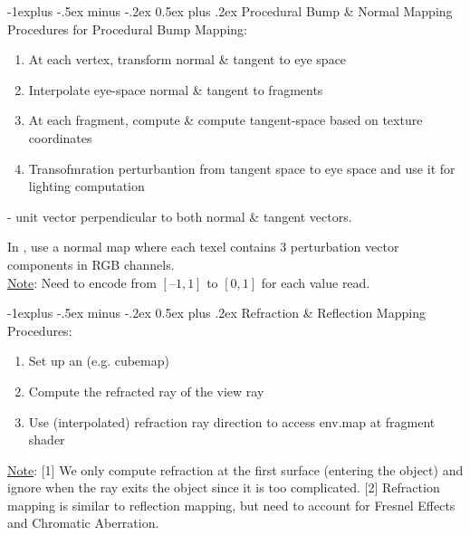 \documentclass[10pt,landscape,letterpaper]{article}
\makeatletter
\renewcommand{\subsection}{\@startsection{subsection}{2}{0mm}%
                                {-1explus -.5ex minus -.2ex}%
                                {0.5ex plus .2ex}%
                                {\sffamily\normalsize\itshape}}
\makeatother
\begin{document}
\begin{multicols}{3}
\subsection{Procedural Bump \& Normal Mapping}
Procedures for Procedural Bump Mapping:
\begin{enumerate}
	\item At each vertex, transform normal  \& tangent to eye space
	\item Interpolate eye-space normal \& tangent to fragments
	\item At each fragment, compute  \& compute tangent-space  based on texture coordinates
	\item Transofmration perturbantion from tangent space to eye space and use it for lighting computation
\end{enumerate}
 - unit vector perpendicular to both normal \& tangent vectors.

\smallskip

In , use a normal map where each texel contains 3 perturbation vector components in  RGB channels.
\\
\underline{Note}: Need to encode from $[–1,1]$ to $[0,1]$ for each value read.


\subsection{Refraction \& Reflection Mapping}
Procedures:
\begin{enumerate}
	\item Set up an  (e.g. cubemap)
	\item Compute the refracted ray of the view ray
	\item Use (interpolated) refraction ray direction to access env.map at fragment shader
\end{enumerate}

\underline{Note}: [1] We only compute refraction at the first surface (entering the object) and ignore when the ray exits the object since it is too complicated. [2] Refraction mapping is similar to reflection mapping, but need to account for Fresnel Effects and Chromatic Aberration.


\end{multicols}
\end{document}
